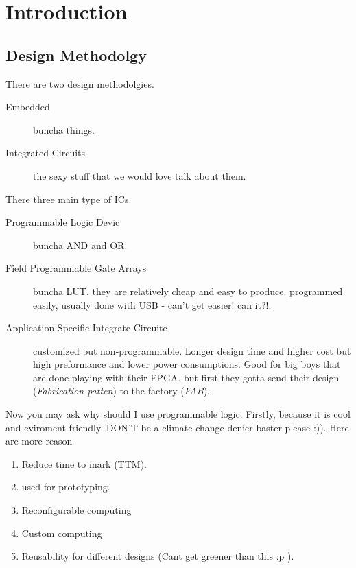 \chapter{Introduction}
\thispagestyle{headings}

\section{Design Methodolgy}
There are two design methodolgies.
\begin{description}
    \item [Embedded] buncha things.
    \item [Integrated Circuits] the sexy stuff that we would love talk about them.
\end{description}

There three main type of ICs.
\begin{description}
    \item [Programmable Logic Devic] buncha AND and OR.
    \item [Field Programmable Gate Arrays] buncha LUT. they are relatively cheap and easy to produce. programmed easily, usually done with USB - can't get easier! can it?!.
    \item [Application Specific Integrate Circuite] customized but non-programmable. Longer design time and higher cost but high preformance and lower power consumptions. Good for big boys that are done playing with their FPGA. but first they gotta send their design (\textit{Fabrication patten}) to the factory (\textit{FAB}).
\end{description}

Now you may ask why should I use programmable logic. Firstly, because it is cool and eviroment friendly. DON'T be a climate change denier baster please :)). Here are more reason
\begin{enumerate}
    \item Reduce time to mark (TTM).
    \item used for prototyping.
    \item Reconfigurable computing
    \item Custom computing
    \item Reusability for different designs (Cant get greener than this :p ).
\end{enumerate}

